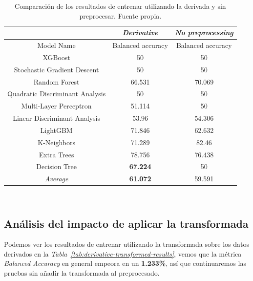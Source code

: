 \begin{table}[!ht]
    \centering
    \begin{tabular}{|c|c|c|}
        \hline
        & \textit{Derivative} & \textit{No preprocessing} \\ \hline
        Model Name & Balanced accuracy & Balanced accuracy \\ \hline
        XGBoost & 50 & 50 \\ 
        Stochastic Gradient Descent & 50 & 50 \\ 
        Random Forest & 66.531 & 70.069 \\ 
        Quadratic Discriminant Analysis & 50 & 50 \\ 
        Multi-Layer Perceptron & 51.114 & 50 \\ 
        Linear Discriminant Analysis & 53.96 & 54.306 \\ 
        LightGBM & 71.846 & 62.632 \\ 
        K-Neighbors & 71.289 & 82.46 \\ 
        Extra Trees & 78.756 & 76.438 \\ 
        Decision Tree & \textbf{67.224} & 50 \\ \hline
        \textit{Average} & \textbf{61.072} & 59.591 \\ \hline
    \end{tabular}
    \caption{Comparación de los resultados de entrenar utilizando la derivada y sin preprocesar. Fuente propia.}\ \label{tab:nopreprocessing-derivative-results}
\end{table}

\subsection{Análisis del impacto de aplicar la transformada}

Podemos ver los resultados de entrenar utilizando la transformada sobre los datos derivados en la \textit{Tabla\ \ref{tab:derivative-transformed-results}}, vemos que la métrica \textit{Balanced Accuracy} en general empeora en un \textbf{1.233\%}, así que continuaremos las pruebas sin añadir la transformada al preprocesado.

